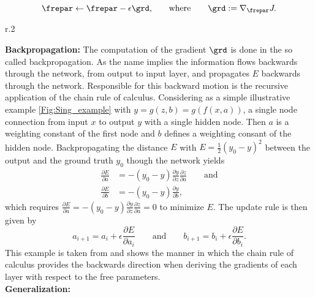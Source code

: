 \begin{equation}
	\frepar \leftarrow \frepar - \epsilon\grd\mathrm{,} \qquad\mathrm{where}\qquad \grd:= \nabla_{\frepar}J\mathrm{.}
	\label{Eq: update}
\end{equation}
\begin{wrapfigure}{r}{.2\textwidth}
	\centering
	\vspace{-10pt}
	
	\vspace{-5pt}
	\caption{\footnotesize A single node network with one hidden node between input and output node.}
	\label{Fig:Sing_example}
\end{wrapfigure}
\textbf{Backpropagation:} The computation of the gradient \(\grd\) is done in the so called backpropagation. As the name implies the information flows backwards through the network, from output to input layer, and propagates \(E\) backwards through the network. Responsible for this backward motion is the recursive application of the chain rule of calculus. Considering as a simple illustrative example \cref{Fig:Sing_example} with \(y=g(z,b)=g(f(x,a))\), a single node connection from input \(x\) to output \(y\) with a single hidden node. Then \(a\) is a weighting constant of the first node and \(b\) defines a weighting consant of the hidden node. Backpropagating the distance \(E\) with \(E = \frac{1}{2}(y_0 -y)^2\) between the output and the ground truth \(y_0\) though the network yields
\begin{align}
	\frac{\partial E}{\partial a} &= -(y_0 - y)\frac{\partial y}{\partial z}\frac{\partial z}{\partial a}\qquad \mathrm{and}\\
	\frac{\partial E}{\partial b} &= -(y_0 - y)\frac{\partial y}{\partial b}\mathrm{,}
\end{align}
which requires \(\frac{\partial E}{\partial a} = -(y_0 - y)\frac{\partial y}{\partial z}\frac{\partial z}{\partial a} = 0\) to minimize \(E\). The update rule is then given by
\begin{equation}
	a_{i+1} = a_i + \epsilon \frac{\partial E}{\partial a_i} \qquad\mathrm{and}\qquad
	b_{i+1} = b_i + \epsilon \frac{\partial E}{\partial b_i}\mathrm{.}
\end{equation}
This example is taken from \cite{Kutz} and shows the manner in which the chain rule of calculus provides the backwards direction when deriving the gradients of each layer with respect to the free parameters.\\
\textbf{Generalization:}
